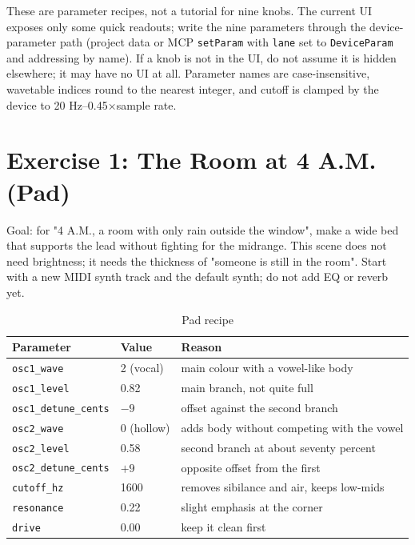 These are parameter recipes, not a tutorial for nine knobs. The current UI exposes only some quick readouts; write the nine parameters through the device-parameter path (project data or MCP \texttt{setParam} with \texttt{lane} set to \texttt{DeviceParam} and addressing by name). If a knob is not in the UI, do not assume it is hidden elsewhere; it may have no UI at all. Parameter names are case-insensitive, wavetable indices round to the nearest integer, and cutoff is clamped by the device to 20 Hz--0.45×sample rate.

\section{Exercise 1: The Room at 4 A.M. (Pad)}

\begin{exercise}
Goal: for "4 A.M., a room with only rain outside the window", make a wide bed that supports the lead without fighting for the midrange. This scene does not need brightness; it needs the thickness of "someone is still in the room". Start with a new MIDI synth track and the default synth; do not add EQ or reverb yet.

\begin{table}[htbp]
\centering
\small
\begin{tabular}{@{}lll@{}}
\hline
Parameter & Value & Reason \\
\hline
\texttt{osc1\_wave} & 2 (vocal) & main colour with a vowel-like body \\
\texttt{osc1\_level} & 0.82 & main branch, not quite full \\
\texttt{osc1\_detune\_cents} & $-9$ & offset against the second branch \\
\texttt{osc2\_wave} & 0 (hollow) & adds body without competing with the vowel \\
\texttt{osc2\_level} & 0.58 & second branch at about seventy percent \\
\texttt{osc2\_detune\_cents} & $+9$ & opposite offset from the first \\
\texttt{cutoff\_hz} & 1600 & removes sibilance and air, keeps low-mids \\
\texttt{resonance} & 0.22 & slight emphasis at the corner \\
\texttt{drive} & 0.00 & keep it clean first \\
\hline
\end{tabular}
\caption{Pad recipe}
\label{tab:pad-recipe}
\end{table}


\end{exercise}
